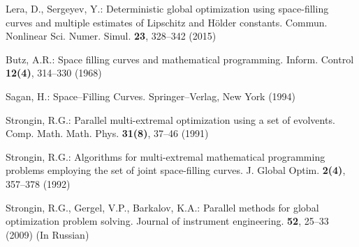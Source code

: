 \begin{thebibliography}{99.}
Lera, D., Sergeyev, Y.: Deterministic global optimization using space-filling curves and multiple estimates of Lipschitz and Hölder constants. Commun. Nonlinear Sci. Numer. Simul. \textbf{23}, 328--342 (2015)

Butz, A.R.: Space filling curves and mathematical programming. Inform. Control \textbf{12(4)}, 314--330 (1968)

Sagan, H.: Space–Filling Curves. Springer–Verlag, New York (1994)

Strongin, R.G.: Parallel multi-extremal optimization using a set of evolvents. Comp. Math. Math. Phys. \textbf{31(8)}, 37--46 (1991)

Strongin, R.G.: Algorithms for multi-extremal mathematical programming problems employing the set of joint space-filling curves. J. Global Optim. \textbf{2(4)}, 357--378 (1992)

Strongin, R.G., Gergel, V.P., Barkalov, K.A.: Parallel methods for global optimization problem solving. Journal of instrument engineering. \textbf{52}, 25--33 (2009) (In Russian)

\end{thebibliography}

%
